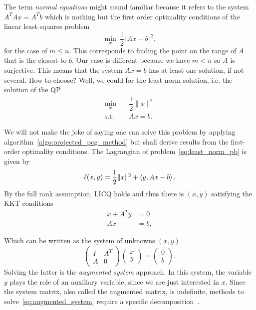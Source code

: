 \documentclass[10pt]{article}
\numberwithin{equation}{section}
\begin{document}
	 
	 The term \textit{normal equations} might sound familiar because it refers to the system $A^TAx=A^Tb$ which is nothing but the first order optimality conditions of the linear least-squares problem
	 \begin{equation}\label{eq:linear_least_squares}
	 	\min_x\ \dfrac{1}{2} \left\Vert Ax-b\right\Vert^2,
	 \end{equation} 
	 for the case of $m\le n$. This corresponds to finding the point on the range of $A$ that is the closest to $b$. Our case is different because we have $m < n$ so $A$ is surjective. This means that the system $Ax=b$ has at least one solution, if not several. How to choose? Well, we could for the least norm solution, i.e. the solution of the QP
	 \begin{equation}\label{eq:least_norm_pb}
	 	\begin{aligned}
	 		\min_x & \quad \dfrac{1}{2}\|x\|^2 \\
	 		\text{s.t.} & \quad Ax=b.
	 	\end{aligned}
	 \end{equation}
	 
	 We will not make the joke of saying one can solve this problem by applying algorithm~\ref{algo:projected_pcg_method} but shall derive results from the first-order optimality conditions. The Lagrangian of problem~\eqref{eq:least_norm_pb} is given by
	 \[\ell(x,y) = \dfrac{1}{2}\|x\|^2 + \left\langle {y} , {Ax-b} \right\rangle,\]
	 By the full rank assumption, LICQ holds and thus there is $(x,y)$ satisfying the KKT conditions
	 \begin{align*}
	 	x + A^Ty &= 0 \\
	 	Ax &= b,
	 \end{align*} 
	 
	 Which can be written as the system of unknowns $(x,y)$
	 \begin{equation}\label{eq:augmented_system}
	 	\begin{pmatrix}
	 	I & A^T \\
	 	A & 0
	 \end{pmatrix} \begin{pmatrix}
	 	x \\ y 
	 \end{pmatrix} = \begin{pmatrix}
	 	0 \\ b
	 \end{pmatrix}.
	 \end{equation}
	 Solving the latter is the \textit{augmented system} approach. In this system, the variable $y$ plays the role of an auxiliary variable, since we are just interested in $x$. Since the system matrix, also called the augmented matrix, is indefinite, methods to solve~\eqref{eq:augmented_system} require a specific decomposition~\cite{golubvanloan:2013}. 
	 
\end{document}

